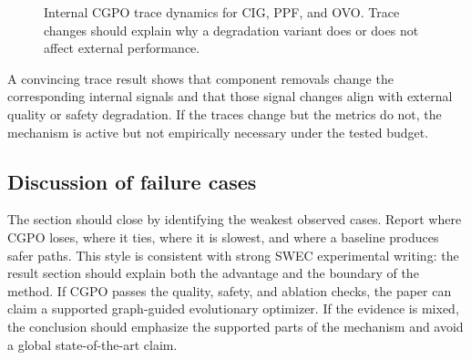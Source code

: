 \begin{figure}[t]
\centering
{}
\caption{Internal CGPO trace dynamics for CIG, PPF, and OVO. Trace changes should explain why a degradation variant does or does not affect external performance.}
\label{fig:trace-dynamics}
\end{figure}

A convincing trace result shows that component removals change the corresponding internal signals and that those signal changes align with external quality or safety degradation. If the traces change but the metrics do not, the mechanism is active but not empirically necessary under the tested budget.

\subsection{Discussion of failure cases}
\label{subsec:failure-cases}

The section should close by identifying the weakest observed cases. Report where CGPO loses, where it ties, where it is slowest, and where a baseline produces safer paths. This style is consistent with strong SWEC experimental writing: the result section should explain both the advantage and the boundary of the method. If CGPO passes the quality, safety, and ablation checks, the paper can claim a supported graph-guided evolutionary optimizer. If the evidence is mixed, the conclusion should emphasize the supported parts of the mechanism and avoid a global state-of-the-art claim.
